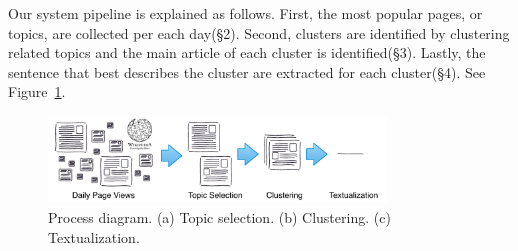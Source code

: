 \documentclass[11pt]{article}
\begin{document}





Our system pipeline is explained as follows. First, the most popular pages, or topics, are collected per each day(\S2). Second, clusters are identified by clustering related topics and the main article of each cluster is identified(\S3). Lastly, the sentence that best describes the cluster are extracted for each cluster(\S4). See Figure~\ref{fig:process}.

\begin{figure}
\centering
\includegraphics[width=0.8\textwidth]{figures/WikiTopicsPipeline.pdf}
\caption{Process diagram. (a) Topic selection. (b) Clustering. (c) Textualization.}
\label{fig:process}
\end{figure}
\end{document}
